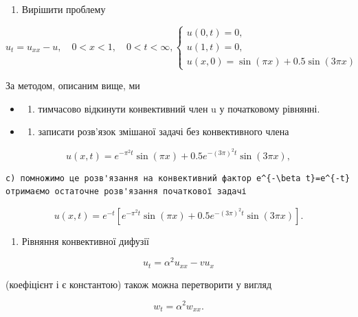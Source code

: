 \documentclass[
  ukrainian,
]{article}
\providecommand{\tightlist}{%
  \setlength{\itemsep}{0pt}\setlength{\parskip}{0pt}}
\begin{document}
\begin{enumerate}
\def\labelenumi{\arabic{enumi}.}
\tightlist
\item
  Вирішити проблему
\end{enumerate}

\[
u_t = u_{xx} - u, \quad 0 < x < 1, \quad 0 < t < \infty,
\begin{cases} u(0, t) = 0, \\ u(1, t) = 0, \\ u(x, 0) = \sin(\pi x) + 0.5\sin(3\pi x) \end{cases}
\]

За методом, описаним вище, ми

\begin{itemize}
\tightlist
\item
  \begin{enumerate}
  \def\labelenumi{\alph{enumi})}
  \tightlist
  \item
    тимчасово відкинути конвективний член u у початковому рівнянні.
  \end{enumerate}
\item
  \begin{enumerate}
  \def\labelenumi{\alph{enumi})}
  \setcounter{enumi}{1}
  \tightlist
  \item
    записати розв'язок змішаної задачі без конвективного члена
  \end{enumerate}
\end{itemize}

\[
u(x, t) = e^{-\pi^2 t} \sin(\pi x) + 0.5e^{-(3\pi)^2 t} \sin(3\pi x),
\]

\begin{verbatim}
c) помножимо це розв'язання на конвективний фактор e^{-\beta t}=e^{-t} отримаємо остаточне розв'язання початкової задачі
\end{verbatim}

\[
u(x, t) = e^{-t} \left[ e^{-\pi^2 t} \sin(\pi x) + 0.5e^{-(3\pi)^2 t} \sin(3\pi x) \right].
\]

\begin{enumerate}
\def\labelenumi{\arabic{enumi}.}
\setcounter{enumi}{1}
\tightlist
\item
  Рівняння конвективної дифузії
\end{enumerate}

\[
u_t = \alpha^2 u_{xx} - v u_x
\]

(коефіцієнт і є константою) також можна перетворити у вигляд

\[
w_t = \alpha^2 w_{xx}.
\]
\end{document}
